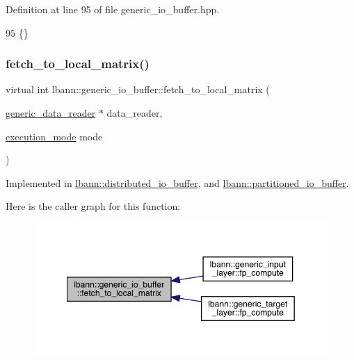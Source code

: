 Definition at line 95 of file generic\+\_\+io\+\_\+buffer.\+hpp.


\begin{DoxyCode}
95 \{\}
\end{DoxyCode}
\mbox{\label{classlbann_1_1generic__io__buffer_af9fc2100d41328fe399acf7bced950d7}} 
\subsubsection{\texorpdfstring{fetch\+\_\+to\+\_\+local\+\_\+matrix()}{fetch\_to\_local\_matrix()}}
{\footnotesize\ttfamily virtual int lbann\+::generic\+\_\+io\+\_\+buffer\+::fetch\+\_\+to\+\_\+local\+\_\+matrix (\begin{DoxyParamCaption}\item[{\hyperlink{classlbann_1_1generic__data__reader}{generic\+\_\+data\+\_\+reader} $\ast$}]{data\+\_\+reader,  }\item[{\hyperlink{base_8hpp_a2781a159088df64ed7d47cc91c4dc0a8}{execution\+\_\+mode}}]{mode }\end{DoxyParamCaption})\hspace{0.3cm}{\ttfamily [pure virtual]}}



Implemented in \hyperlink{classlbann_1_1distributed__io__buffer_abfeb87d4dc402b482db60926ca9b3ec1}{lbann\+::distributed\+\_\+io\+\_\+buffer}, and \hyperlink{classlbann_1_1partitioned__io__buffer_a777719c9cebe912dc4c005e2c78d77c8}{lbann\+::partitioned\+\_\+io\+\_\+buffer}.

Here is the caller graph for this function\+:\nopagebreak
\begin{figure}[H]
\begin{center}
\leavevmode
\includegraphics[width=349pt]{classlbann_1_1generic__io__buffer_af9fc2100d41328fe399acf7bced950d7_icgraph}
\end{center}
\end{figure}
\mbox{\label{classlbann_1_1generic__io__buffer_adc77c0a280f8a200a8d8495c3a371ebb}} 
